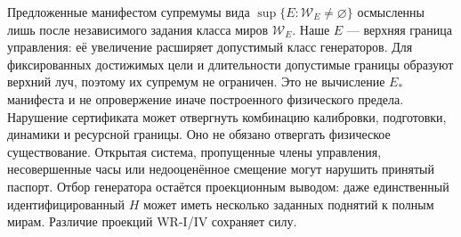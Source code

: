{Предложенные манифестом супремумы вида $\sup\{E:\mathcal W_E\ne\varnothing\}$ осмысленны лишь после независимого задания класса миров $\mathcal W_E$. Наше $E$ --- верхняя граница управления: её увеличение расширяет допустимый класс генераторов. Для фиксированных достижимых цели и длительности допустимые границы образуют верхний луч, поэтому их супремум не ограничен. Это не вычисление $E_*$ манифеста и не опровержение иначе построенного физического предела.}
{Нарушение сертификата может отвергнуть комбинацию калибровки, подготовки, динамики и ресурсной границы. Оно не обязано отвергать физическое существование. Открытая система, пропущенные члены управления, несовершенные часы или недооценённое смещение могут нарушить принятый паспорт. Отбор генератора остаётся проекционным выводом: даже единственный идентифицированный $H$ может иметь несколько заданных поднятий к полным мирам. Различие проекций WR-I/IV сохраняет силу.}

